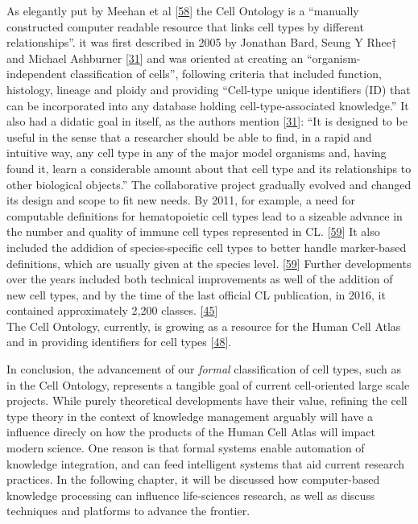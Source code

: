 As elegantly put by Meehan et al {[}\protect\hyperlink{ref-UduMr7x2}{58}{]} the Cell Ontology is a ``manually constructed computer readable resource that links cell types by different relationships''.
it was first described in 2005 by Jonathan Bard, Seung Y Rhee† and Michael Ashburner {[}\protect\hyperlink{ref-1CI8uS6ka}{31}{]} and was oriented at creating an ``organism-independent classification of cells'', following criteria that included function, histology, lineage and ploidy and providing ``Cell-type unique identifiers (ID) that can be incorporated into any database holding cell-type-associated knowledge.'' It also had a didatic goal in itself, as the authors mention {[}\protect\hyperlink{ref-1CI8uS6ka}{31}{]}:
``It is designed to be useful in the sense that a researcher should be able to find, in a rapid and intuitive way, any cell type in any of the major model organisms and, having found it, learn a considerable amount about that cell type and its relationships to other biological objects.''
The collaborative project gradually evolved and changed its design and scope to fit new needs.
By 2011, for example, a need for computable definitions for hematopoietic cell types lead to a sizeable advance in the number and quality of immune cell types represented in CL. {[}\protect\hyperlink{ref-ecteO8vI}{59}{]}
It also included the addidion of species-specific cell types to better handle marker-based definitions, which are usually given at the species level. {[}\protect\hyperlink{ref-ecteO8vI}{59}{]}
Further developments over the years included both technical improvements as well of the addition of new cell types, and by the time of the last official CL publication, in 2016, it contained approximately 2,200 classes. {[}\protect\hyperlink{ref-agnqfdk6}{45}{]}\\
The Cell Ontology, currently, is growing as a resource for the Human Cell Atlas and in providing identifiers for cell types {[}\protect\hyperlink{ref-qT8WxqjA}{48}{]}.

In conclusion, the advancement of our \emph{formal} classification of cell types, such as in the Cell Ontology, represents a tangible goal of current cell-oriented large scale projects.
While purely theoretical developments have their value, refining the cell type theory in the context of knowledge management arguably will have a influence direcly on how the products of the Human Cell Atlas will impact modern science.
One reason is that formal systems enable automation of knowledge integration, and can feed intelligent systems that aid current research practices.
In the following chapter, it will be discussed how computer-based knowledge processing can influence life-sciences research, as well as discuss techniques and platforms to advance the frontier.

